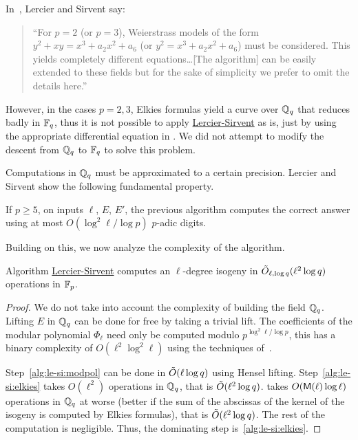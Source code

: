 \begin{nota}
  In~\cite{lercier+sirvent08}, Lercier and Sirvent say:
  \begin{quote}
    ``For $p = 2$ (or $p = 3$), Weierstrass models of the form $y^2 + xy
    = x^3 + a_2 x^2 + a_6$ (or $y^2 = x^3 + a_2 x^2 + a_6$) must be
    considered. This yields completely different equations\dots [The
    algorithm] can be easily extended to these fields but for the
    sake of simplicity we prefer to omit the details here.''
  \end{quote}
  
    However, in the cases $p=2,3$, Elkies formulas yield a curve
  over $\mathbb{Q}_q$ that reduces badly in $\mathbb{F}_q$, thus it is not possible to
  apply \hyperref[alg:le-si]{Lercier-Sirvent} as is, just by using the
  appropriate differential equation in
  \hyperref[alg:bmss]{}. We did not attempt to modify the
  descent from $\mathbb{Q}_q$ to $\mathbb{F}_q$ to solve this problem.
\end{nota}

Computations in $\mathbb{Q}_q$ must be approximated to a certain
precision. Lercier and Sirvent show the following fundamental
property.

\begin{proposition}
  If $p\ge5$, on inputs $\ell$, $E$, $E'$, the previous algorithm
  computes the correct answer using at most $O(\log^2\ell/\log p)$
  $p$-adic digits.
\end{proposition}

Building on this, we now analyze the complexity of the algorithm.

\begin{proposition}
  \label{th:lercier-sirvent}
  Algorithm \hyperref[alg:le-si]{Lercier-Sirvent} computes an
  $\ell$-degree isogeny in $\tilde{O}_{\ell,\log q}(\ell^2\log q)$
  operations in $\mathbb{F}_p$.
\end{proposition}
\begin{proof}
  We do not take into account the complexity of building the field
  $\mathbb{Q}_q$. Lifting $E$ in $\mathbb{Q}_q$ can be done for free by taking a
  trivial lift. The coefficients of the modular polynomial $\Phi_\ell$
  need only be computed modulo $p^{\log^2\ell/\log p}$, this has a
  binary complexity of $O(\ell^2\log^2\ell)$ using the techniques
  of~\cite{sutherland10:modpol}.

  Step~\ref{alg:le-si:modpol} can be done in $\tilde{O}(\ell\log q)$
  using Hensel lifting. Step~\ref{alg:le-si:elkies} takes $O(\ell^2)$
  operations in $\mathbb{Q}_q$, that is $\tilde{O}(\ell^2\log
  q)$. \hyperref[alg:bmss]{} takes $O(\mathsf{M}(\ell)\log\ell)$
  operations in $\mathbb{Q}_q$ at worse (better if the sum of the abscissas of
  the kernel of the isogeny is computed by Elkies formulas), that is
  $\tilde{O}(\ell^2\log q)$. The rest of the computation is
  negligible. Thus, the dominating step is~\ref{alg:le-si:elkies}.
\end{proof}

